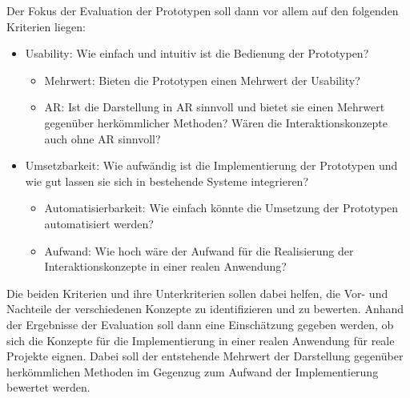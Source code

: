 \newpage

Der Fokus der Evaluation der Prototypen soll dann vor allem auf den folgenden Kriterien liegen:

\begin{itemize}
    \item Usability: Wie einfach und intuitiv ist die Bedienung der Prototypen?
    \begin{itemize}
        \item Mehrwert: Bieten die Prototypen einen Mehrwert der Usability?
        \item AR: Ist die Darstellung in AR sinnvoll und bietet sie einen Mehrwert gegenüber herkömmlicher Methoden? Wären die Interaktionskonzepte auch ohne AR sinnvoll?
    \end{itemize}
    \item Umsetzbarkeit: Wie aufwändig ist die Implementierung der Prototypen und wie gut lassen sie sich in bestehende Systeme integrieren?
    \begin{itemize}
        \item Automatisierbarkeit: Wie einfach könnte die Umsetzung der Prototypen automatisiert werden?
        \item Aufwand: Wie hoch wäre der Aufwand für die Realisierung der Interaktionskonzepte in einer realen Anwendung?
    \end{itemize}
\end{itemize}

Die beiden Kriterien und ihre Unterkriterien sollen dabei helfen, die Vor- und Nachteile der verschiedenen Konzepte zu identifizieren und zu bewerten.
Anhand der Ergebnisse der Evaluation soll dann eine Einschätzung gegeben werden, ob sich die Konzepte für die Implementierung in einer realen Anwendung für reale Projekte eignen.
Dabei soll der entstehende Mehrwert der Darstellung gegenüber herkömmlichen Methoden im Gegenzug zum Aufwand der Implementierung bewertet werden.

